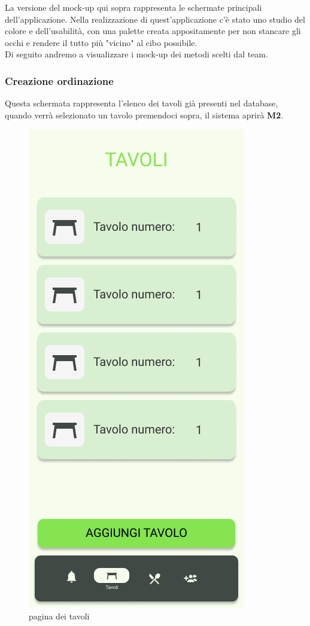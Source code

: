 La versione del mock-up qui sopra rappresenta le schermate principali dell'applicazione. Nella realizzazione di quest'applicazione c'è stato uno studio del colore e dell'usabilità, con una palette creata appositamente per non stancare gli occhi e rendere il tutto più "vicino" al cibo possibile.\\
Di seguito andremo a visualizzare i mock-up dei metodi scelti dal team.
\newpage
\subsubsection{Creazione ordinazione}
Questa schermata rappresenta l'elenco dei tavoli già presenti nel database, quando verrà selezionato un tavolo premendoci sopra, il sistema aprirà \textbf{M2}.
\begin{figure}[H]
  \centering
  \includegraphics[scale=0.6]{img/mock-up/tables.png}
  \caption{pagina dei tavoli}
\end{figure}\newpage
